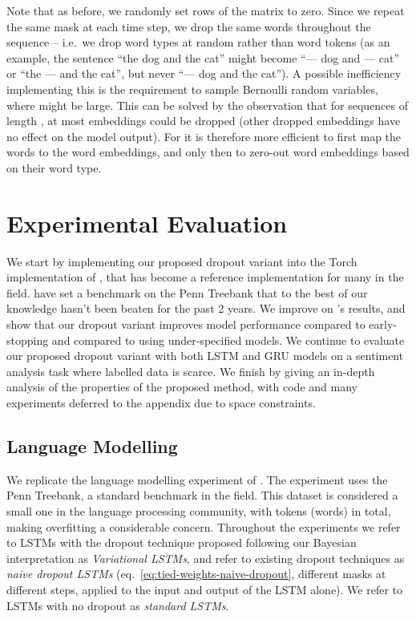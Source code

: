 \documentclass{article}
\theoremstyle{definition}
\begin{document}
Note that as before, we randomly set rows of the matrix  to zero. Since we repeat the same mask at each time step, we drop the same words throughout the sequence -- i.e.\ we drop word types at random rather than word tokens (as an example, the sentence ``the dog and the cat'' might become ``--- dog and --- cat'' or ``the --- and the cat'', but never ``--- dog and the cat''). A possible inefficiency implementing this is the requirement to sample  Bernoulli random variables, where  might be large. This can be solved by the observation that for sequences of length , at most  embeddings could be dropped (other dropped embeddings have no effect on the model output). For  it is therefore more efficient to first map the words to the word embeddings, and only then to zero-out word embeddings based on their word type.







\section{Experimental Evaluation}



We start by implementing our proposed dropout variant into the Torch implementation of \citet{zaremba2014recurrent}, that has become a reference implementation for many in the field. 
\citet{zaremba2014recurrent} have set a benchmark on the Penn Treebank that to the best of our knowledge hasn't been beaten for the past 2 years.
We improve on \citep{zaremba2014recurrent}'s results,
and show that our dropout variant improves model performance compared to early-stopping and compared to using under-specified models.
We continue to evaluate our proposed dropout variant with both LSTM and GRU models on a sentiment analysis task where labelled data is scarce. We finish by giving an in-depth analysis of the properties of the proposed method, with code and many experiments deferred to the appendix due to space constraints.

\subsection{Language Modelling}

We replicate the language modelling experiment of \citet*{zaremba2014recurrent}. 
The experiment uses the Penn Treebank, a standard benchmark in the field.
This dataset is considered a small one in the language processing community, with  tokens (words) in total, making overfitting a considerable concern. 
Throughout the experiments we refer to LSTMs with the dropout technique proposed following our Bayesian interpretation as \textit{Variational LSTMs}, and refer to existing dropout techniques as \textit{naive dropout LSTMs} 
(eq.\ \eqref{eq:tied-weights-naive-dropout}, 
different masks at different steps, applied to the input and output of the LSTM alone). We refer to LSTMs with no dropout as \textit{standard LSTMs}. 
\end{document}
